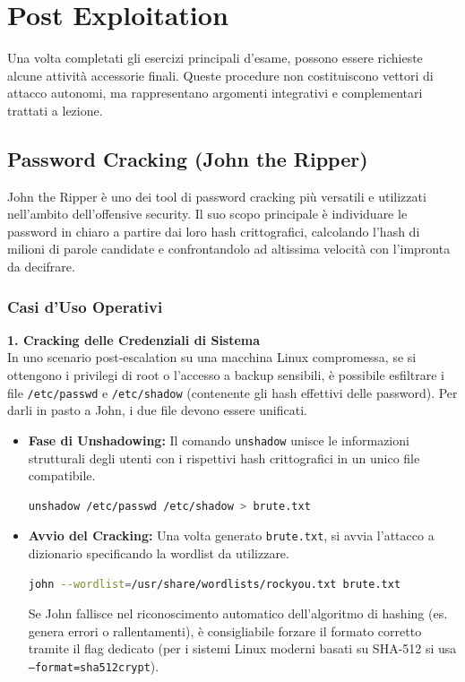 \documentclass[12pt,a4paper]{report}
\begin{document}
	\chapter{Post Exploitation}
	
	Una volta completati gli esercizi principali d'esame, possono essere richieste alcune attività accessorie finali. Queste procedure non costituiscono vettori di attacco autonomi, ma rappresentano argomenti integrativi e complementari trattati a lezione.
	
	\section{Password Cracking (John the Ripper)}
	
	John the Ripper è uno dei tool di password cracking più versatili e utilizzati nell'ambito dell'offensive security. Il suo scopo principale è individuare le password in chiaro a partire dai loro hash crittografici, calcolando l'hash di milioni di parole candidate e confrontandolo ad altissima velocità con l'impronta da decifrare.
	
	\subsection{Casi d'Uso Operativi}
	
	\textbf{1. Cracking delle Credenziali di Sistema}\\
	In uno scenario post-escalation su una macchina Linux compromessa, se si ottengono i privilegi di root o l'accesso a backup sensibili, è possibile esfiltrare i file \texttt{/etc/passwd} e \texttt{/etc/shadow} (contenente gli hash effettivi delle password). Per darli in pasto a John, i due file devono essere unificati.
	
	\begin{itemize}
		\item \textbf{Fase di Unshadowing:} Il comando \texttt{unshadow} unisce le informazioni strutturali degli utenti con i rispettivi hash crittografici in un unico file compatibile.
		\begin{lstlisting}[language=bash]
			unshadow /etc/passwd /etc/shadow > brute.txt
		\end{lstlisting}
		
		\item \textbf{Avvio del Cracking:} Una volta generato \texttt{brute.txt}, si avvia l'attacco a dizionario specificando la wordlist da utilizzare.
		\begin{lstlisting}[language=bash]
			john --wordlist=/usr/share/wordlists/rockyou.txt brute.txt
		\end{lstlisting}
		
		\begin{nota}
			Se John fallisce nel riconoscimento automatico dell'algoritmo di hashing (es. genera errori o rallentamenti), è consigliabile forzare il formato corretto tramite il flag dedicato (per i sistemi Linux moderni basati su SHA-512 si usa \texttt{--format=sha512crypt}).
		\end{nota}

	\end{itemize}
	
\end{document}
